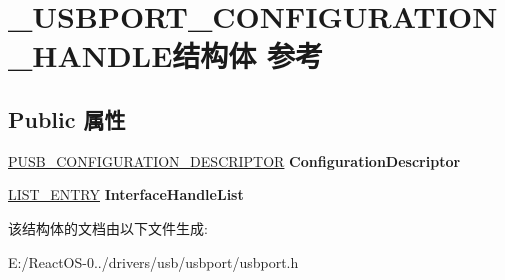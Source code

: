 \hypertarget{struct___u_s_b_p_o_r_t___c_o_n_f_i_g_u_r_a_t_i_o_n___h_a_n_d_l_e}{}\section{\+\_\+\+U\+S\+B\+P\+O\+R\+T\+\_\+\+C\+O\+N\+F\+I\+G\+U\+R\+A\+T\+I\+O\+N\+\_\+\+H\+A\+N\+D\+L\+E结构体 参考}
\label{struct___u_s_b_p_o_r_t___c_o_n_f_i_g_u_r_a_t_i_o_n___h_a_n_d_l_e}
\subsection*{Public 属性}
\begin{DoxyCompactItemize}
\item 
\mbox{\label{struct___u_s_b_p_o_r_t___c_o_n_f_i_g_u_r_a_t_i_o_n___h_a_n_d_l_e_a4579ecf9b253999434d14e9b1be08c89}} 
\hyperlink{struct___u_s_b___c_o_n_f_i_g_u_r_a_t_i_o_n___d_e_s_c_r_i_p_t_o_r}{P\+U\+S\+B\+\_\+\+C\+O\+N\+F\+I\+G\+U\+R\+A\+T\+I\+O\+N\+\_\+\+D\+E\+S\+C\+R\+I\+P\+T\+OR} {\bfseries Configuration\+Descriptor}
\item 
\mbox{\label{struct___u_s_b_p_o_r_t___c_o_n_f_i_g_u_r_a_t_i_o_n___h_a_n_d_l_e_af433e7a8c19c1dea2bd08f990372348b}} 
\hyperlink{struct___l_i_s_t___e_n_t_r_y}{L\+I\+S\+T\+\_\+\+E\+N\+T\+RY} {\bfseries Interface\+Handle\+List}
\end{DoxyCompactItemize}


该结构体的文档由以下文件生成\+:\begin{DoxyCompactItemize}
\item 
E\+:/\+React\+O\+S-\/0../drivers/usb/usbport/usbport.\+h\end{DoxyCompactItemize}
